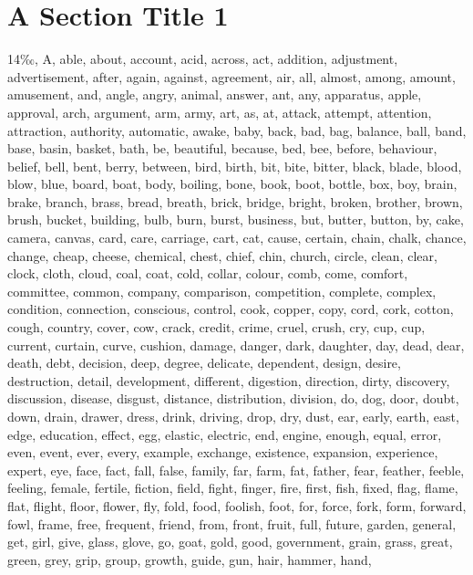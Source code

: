 \section{A Section Title 1 
}
14{\mktsFontfileOptima‰}, A, able, about, account, acid, across, act, addition, adjustment,
advertisement, after, again, against, agreement, air, all, almost, among,
amount, amusement, and, angle, angry, animal, answer, ant, any, apparatus,
apple, approval, arch, argument, arm, army, art, as, at, attack, attempt,
attention, attraction, authority, automatic, awake, baby, back, bad, bag,
balance, ball, band, base, basin, basket, bath, be, beautiful, because, bed,
bee, before, behaviour, belief, bell, bent, berry, between, bird, birth, bit,
bite, bitter, black, blade, blood, blow, blue, board, boat, body, boiling,
bone, book, boot, bottle, box, boy, brain, brake, branch, brass, bread,
breath, brick, bridge, bright, broken, brother, brown, brush, bucket,
building, bulb, burn, burst, business, but, butter, button, by, cake, camera,
canvas, card, care, carriage, cart, cat, cause, certain, chain, chalk, chance,
change, cheap, cheese, chemical, chest, chief, chin, church, circle, clean,
clear, clock, cloth, cloud, coal, coat, cold, collar, colour, comb, come,
comfort, committee, common, company, comparison, competition, complete,
complex, condition, connection, conscious, control, cook, copper, copy, cord,
cork, cotton, cough, country, cover, cow, crack, credit, crime, cruel, crush,
cry, cup, cup, current, curtain, curve, cushion, damage, danger, dark,
daughter, day, dead, dear, death, debt, decision, deep, degree, delicate,
dependent, design, desire, destruction, detail, development, different,
digestion, direction, dirty, discovery, discussion, disease, disgust,
distance, distribution, division, do, dog, door, doubt, down, drain, drawer,
dress, drink, driving, drop, dry, dust, ear, early, earth, east, edge,
education, effect, egg, elastic, electric, end, engine, enough, equal, error,
even, event, ever, every, example, exchange, existence, expansion, experience,
expert, eye, face, fact, fall, false, family, far, farm, fat, father, fear,
feather, feeble, feeling, female, fertile, fiction, field, fight, finger,
fire, first, fish, fixed, flag, flame, flat, flight, floor, flower, fly, fold,
food, foolish, foot, for, force, fork, form, forward, fowl, frame, free,
frequent, friend, from, front, fruit, full, future, garden, general, get,
girl, give, glass, glove, go, goat, gold, good, government, grain, grass,
great, green, grey, grip, group, growth, guide, gun, hair, hammer, hand,
